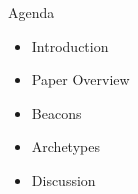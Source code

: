 \begin{frame}{Agenda}
    \begin{itemize}
        \item Introduction 
        \item Paper Overview
        \item Beacons
        \item Archetypes
        \item Discussion
    \end{itemize}        
\end{frame}
